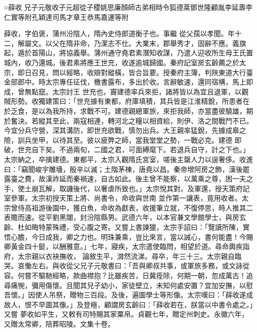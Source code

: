 
\begin{pinyinscope}

 ○薛收
 兄子元敬收子元超從子稷姚思廉顏師古弟相時令狐德棻鄧世隆顧胤李延壽李仁實等附孔穎達司馬才章王恭馬嘉運等附



 薛收，字伯褒，蒲州汾陰人，隋內史侍郎道衡子也。事繼
 從父孺以孝聞。年十二，解屬文。以父在隋非命，乃潔志不仕。大業末，郡舉秀才，固辭不應。義旗起，遁於首陽山，將協義舉。蒲州通守堯君素潛知收謀，乃遣人迎收所生母王氏置城內，收乃還城。後君素將應王世充，收遂逾城歸國。秦府記室房玄齡薦之於太宗，即日召見，問以經略，收辯對縱橫，皆合旨要。授秦府主簿，判陜東道大行臺金部郎中。時太宗專任征伐，檄書露布，多出於收。言辭敏速，還同宿構，馬上即成，曾無點竄。太宗討王
 世充也，竇建德率兵來拒，諸將皆以為宜且退軍，以觀賊形勢。收獨建策曰：「世充據有東都，府庫填積，其兵皆是江淮精銳，所患者在於乏食，是以為我所持，求戰不可。建德親總軍旅，來拒我師，亦當盡彼驍雄，期於奮決。若縱其至此，兩寇相連，轉河北之糧以相資給，則伊、洛之間戰鬥不已。今宜分兵守營，深其溝防，即世充欲戰，慎勿出兵。大王親率猛銳，先據成皋之險，訓兵坐甲，以待其至。彼以疲弊之師，當我堂堂之勢，一戰必克。建德
 即破，世充自下矣。不過兩旬，二國之君，可面縛麾下。若退兵自守，計之下也。」太宗納之，卒擒建德。東都平，太宗入觀隋氏宮室，嗟後主罄人力以逞奢侈。收進曰：「竊聞峻宇雕墻，殷辛以滅；土階茅棟，唐堯以昌。秦帝增阿房之飾，漢後罷露臺之費，故漢祚延而秦禍速，自古如此。後主曾不能察，以萬乘之尊，困一夫之手，使土崩瓦解，取譏後代，以奢虐所致也。」太宗悅其對。及軍還，授天策府記室參軍。太宗初授天策上將、尚書令，命收與世南
 並作第一讓表，竟用收者。太宗曾侍高祖游後園中，獲白魚，命收為獻表，收援筆立就，不復停思，時人推其二表贍而速。從平劉黑闥，封汾陰縣男。武德六年，以本官兼文學館學士，與房玄齡、杜如晦特蒙殊禮，受心腹之寄。又嘗上書諫獵，太宗手詔曰：「覽讀所陳，實悟心膽，今日成我，卿之力也。明珠兼乘，豈比來言，當以誡心，書何能盡！今賜卿黃金四十鋌，以酬雅意。」七年，寢疾，太宗遣使臨問，相望於道。尋命輿疾詣府，太宗親以衣袂撫收，
 論敘生平，潸然流涕。尋卒，年三十三。太宗親自臨哭。哀慟左右。與收從父兄子元敬書曰：「吾與卿叔共事，或軍旅多務，或文詠從容。何嘗不驅馳經略，款曲襟抱？比雖疾苦，日冀痊除，何期一朝，忽成萬古！追尋痛惋，彌用傷懷。且聞其兒子幼小，家徒壁立，未知何處安置？宜加安撫，以慰吾懷。」因使人吊祭，贈物三百段。及後，遍圖學士等形像。太宗嘆曰：「薛收遂成故人，恨不早圖其像。」及登極，顧謂房玄齡曰：「薛收若在，朕當以中書令處之。」又嘗
 夢收如平生，又敕有司特賜其家粟帛。貞觀七年，贈定州刺史。永徽六年，又贈太常卿，陪葬昭陵。文集十卷。




\end{pinyinscope}
